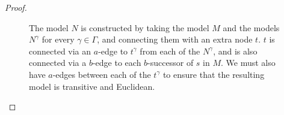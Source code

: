 \begin{proof}
\begin{figure}
\begin{center} %
\caption{
The model $N$ is constructed by taking the model $M$ and the models $N^\gamma$
for every $\gamma \in \Gamma$, and connecting them with an extra node $t$. $t$
is connected via an $a$-edge to $t^\gamma$ from each of the $N^\gamma$, and is
also connected via a $b$-edge to each $b$-successor of $s$ in $M$. We must also
have $a$-edges between each of the $t^\gamma$ to ensure that the resulting model
is transitive and Euclidean.
}
\end{center}
\end{figure}


\end{proof}
